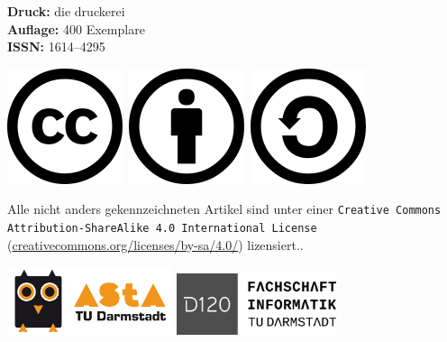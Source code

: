 \vspace{3mm}
\textbf{Druck:} die druckerei\\
\textbf{Auflage:} 400 Exemplare\\
\textbf{ISSN:} 1614–4295

\vspace{3mm}
\begin{minipage}{0.2\textwidth}
\includegraphics[scale=.3]{grafik/CreativeCommons/cc}~\includegraphics[scale=.3]{grafik/CreativeCommons/by}~\includegraphics[scale=.3]{grafik/CreativeCommons/sa}
\end{minipage}
\begin{minipage}{0.8\textwidth}
Alle nicht anders gekennzeichneten Artikel sind unter einer \texttt{Creative Commons
Attribution-ShareAlike 4.0 International License}
(\url{creativecommons.org/licenses/by-sa/4.0/}) lizensiert..
\end{minipage}

\vspace{3mm}
\includegraphics[height=20mm]{grafik/eule_final_orange} \hspace{8mm}
\includegraphics[height=18mm]{grafik/logo_ohne_rand}

\pagebreak
